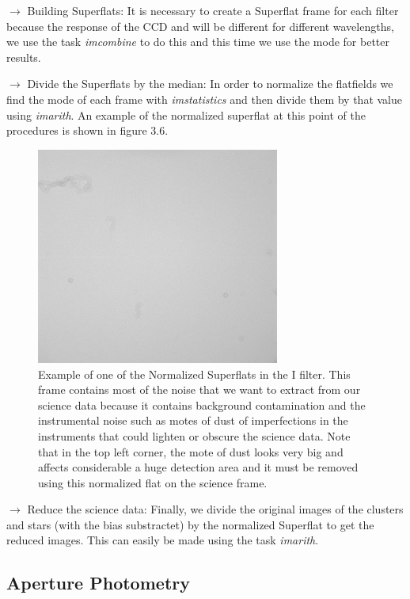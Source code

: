 $\rightarrow$ Building Superflats: It is necessary to create a Superflat frame for each filter because the response of the CCD and will be different for different wavelengths, we use the task \textit{imcombine} to do this and this time we use the mode for better results.   

$\rightarrow$ Divide the Superflats by the median: In order to normalize the flatfields we find the mode of each frame with \textit{imstatistics} and then divide them by that value using \textit{imarith}. An example of the normalized superflat at this point of the procedures is shown in figure 3.6.

\begin{figure}[]
\centering
\includegraphics[width=8cm]{images/flat_I.png}
\caption[Normalized Superflat for the filter I]{Example of one of the Normalized Superflats in the I filter. This frame contains most of the noise that we want to extract from our science data because it contains background contamination and the instrumental noise such as motes of dust of imperfections in the instruments that could lighten or obscure the science data. Note that in the top left corner, the mote of dust looks very big and affects considerable a huge detection area and it must be removed using this normalized flat on the science frame.}
\end{figure}

$\rightarrow$ Reduce the science data: Finally, we divide the original images of the clusters and stars (with the bias substractet) by the normalized Superflat to get the reduced images. This can easily be made using the task \textit{imarith}.

\subsection{Aperture Photometry}


